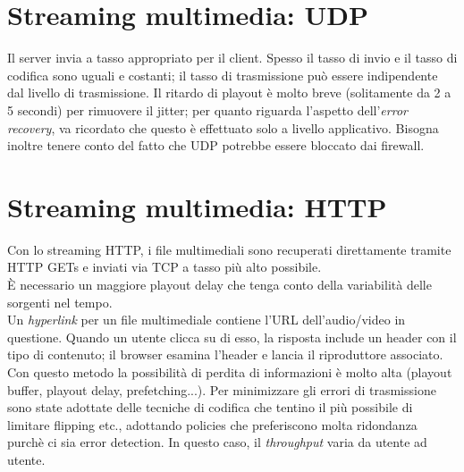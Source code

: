 \section{Streaming multimedia: UDP}
Il server invia a tasso appropriato per il client. Spesso il tasso di invio e il tasso di codifica sono uguali e costanti; il tasso di trasmissione può essere indipendente dal livello di trasmissione. Il ritardo di playout è molto breve (solitamente da 2 a 5 secondi) per rimuovere il jitter; per quanto riguarda l'aspetto dell'\textit{error recovery}, va ricordato che questo è effettuato solo a livello applicativo. Bisogna inoltre tenere conto del fatto che UDP potrebbe essere bloccato dai firewall.

\section{Streaming multimedia: HTTP}
Con lo streaming HTTP, i file multimediali sono recuperati direttamente tramite HTTP GETs e inviati via TCP a tasso più alto possibile.\\
È necessario un maggiore playout delay che tenga conto della variabilità delle sorgenti nel tempo.\\
Un \textit{hyperlink} per un file multimediale contiene l'URL dell'audio/video in questione. Quando un utente clicca su di esso, la risposta include un header con il tipo di contenuto; il browser esamina l'header e lancia il riproduttore associato.\\
Con questo metodo la possibilità di perdita di informazioni è molto alta (playout buffer, playout delay, prefetching...). Per minimizzare gli errori di trasmissione sono state adottate delle tecniche di codifica che tentino il più possibile di limitare flipping etc., adottando policies che preferiscono molta ridondanza purchè ci sia error detection. In questo caso, il \textit{throughput} varia da utente ad utente.

